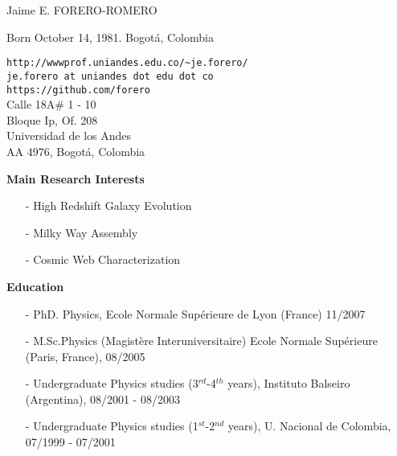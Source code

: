 \documentclass[9pt]{article}
\begin{document}
\noindent

\noindent
{{\Large Jaime E. FORERO-ROMERO}}\\
\begin{flushleft}
Born October 14, 1981. Bogot\'a, Colombia\\
\end{flushleft}
\begin{flushright}
\verb"http://wwwprof.uniandes.edu.co/~je.forero/" \\{\tt{je.forero at uniandes dot edu dot co}}\\
\verb"https://github.com/forero"\\
Calle 18A\# 1 - 10\\
Bloque Ip, Of. 208\\
Universidad de los Andes\\
AA 4976, Bogot\'a, Colombia\\
\end{flushright}


{\bf Main Research Interests}
\begin{itemize}
\item[-]{High Redshift Galaxy Evolution}
\item[-]{Milky Way Assembly}
\item[-]{Cosmic Web Characterization}
\end{itemize}

{\bf Education}
\indent
\begin{itemize}
\item[-] PhD. Physics, Ecole Normale Sup\'erieure de Lyon (France) 11/2007
\item[-] M.Sc.Physics (Magistère Interuniversitaire)  Ecole Normale
  Sup\'erieure (Paris, France), 08/2005
\item[-] Undergraduate Physics studies (3$^{rd}$-4$^{th}$ years),
  Instituto Balseiro (Argentina), 08/2001 - 08/2003
\item[-] Undergraduate Physics studies (1$^{st}$-2$^{nd}$ years),
  U. Nacional de Colombia, 07/1999 -  07/2001
\end{itemize}
\end{document}
